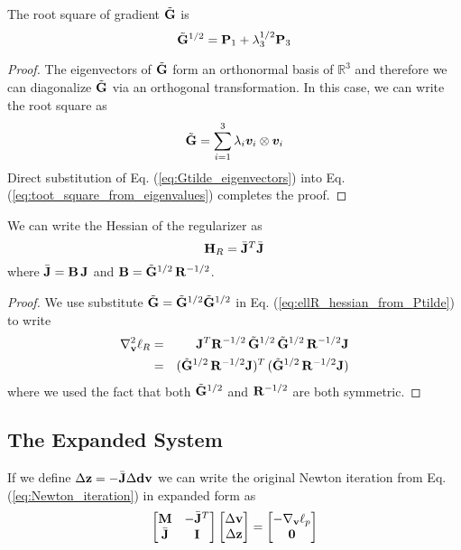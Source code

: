 \begin{theorem}
The root square of gradient $\tilde{{\mathbf{G}}}$ is 
\begin{equation}
	\tilde{{\mathbf{G}}}^{1/2} = {\mathbf{P}}_1 + \lambda_3^{1/2}{\mathbf{P}}_3
\end{equation}
\end{theorem}
\begin{proof}
The eigenvectors of $\tilde{{\mathbf{G}}}$ form an orthonormal basis of $\mathbb{R}^3$ and
therefore we can diagonalize $\tilde{{\mathbf{G}}}$ via an orthogonal transformation. In
this case, we can write the root square as
\begin{equation}
	\sGtilde = \sum_{i=1}^{3} \lambda_i\vf{v}_i\otimes\vf{v}_i
	\label{eq:toot_square_from_eigenvalues}
\end{equation}
Direct substitution of Eq. (\ref{eq:Gtilde_eigenvectors}) into Eq.
(\ref{eq:toot_square_from_eigenvalues}) completes the proof.
\end{proof}




\begin{theorem}
We can write the Hessian of the regularizer as
\begin{equation}
	{\mathbf{H}}_R=\bar{{\mathbf{J}}}^T\bar{{\mathbf{J}}}
\end{equation}
where $\bar{{\mathbf{J}}}={\mathbf{B}}\,{\mathbf{J}}$ and ${\mathbf{B}} = \tilde{{\mathbf{G}}}^{1/2}\,{\mathbf{R}}^{-1/2}$.
\end{theorem} 
\begin{proof}
We use substitute $\tilde{{\mathbf{G}}}=\tilde{{\mathbf{G}}}^{1/2}\tilde{{\mathbf{G}}}^{1/2}$ in Eq.
(\ref{eq:ellR_hessian_from_Ptilde}) to write
\begin{eqnarray}
	\nabla_{\mathbf{v}}^2\ell_R &=&
	{\mathbf{J}}^T{\mathbf{R}}^{-1/2}\,\tilde{{\mathbf{G}}}^{1/2}\,\tilde{{\mathbf{G}}}^{1/2}\,{\mathbf{R}}^{-1/2}{\mathbf{J}}\nonumber\\
	&=& (\tilde{{\mathbf{G}}}^{1/2}\,{\mathbf{R}}^{-1/2}{\mathbf{J}})^T\,(\tilde{{\mathbf{G}}}^{1/2}\,{\mathbf{R}}^{-1/2}{\mathbf{J}})
\end{eqnarray}
where we used the fact that both $\tilde{{\mathbf{G}}}^{1/2}$ and ${\mathbf{R}}^{-1/2}$ are both
symmetric.
\end{proof}

\subsection{The Expanded System}
If we define $\Delta{\mathbf{z}}=-\bar{{\mathbf{J}}}\Delta{\mathbf{dv}}$ we can write the original
Newton iteration from Eq. (\ref{eq:Newton_iteration}) in expanded form as
\begin{eqnarray}
	\begin{bmatrix}
		{\mathbf{M}} & -\bar{{\mathbf{J}}}^T\\
		\bar{{\mathbf{J}}} & {\mathbf{I}}
	\end{bmatrix}
	\begin{bmatrix}
		\Delta{\mathbf{v}}\\
		\Delta{\mathbf{z}} \end{bmatrix}=
	\begin{bmatrix}
		-\nabla_{\mathbf{v}}\ell_p\\
		{\mathbf{0}}
	\end{bmatrix}	
\end{eqnarray}
